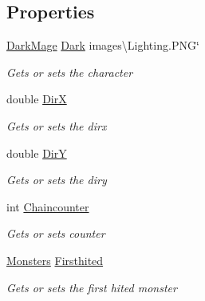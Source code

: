 \subsection*{Properties}
\begin{DoxyCompactItemize}
\item 
\hyperlink{class_lightdeath_1_1_dark_mage}{Dark\+Mage} \hyperlink{class_lightdeath_1_1_lighting_a7411b9d9c87dfdd5471312ac876105fc}{Dark} images\textbackslash{}\+Lighting.\+P\+NG\char`\"{}
\begin{DoxyCompactList}\small\item\em Gets or sets the character \end{DoxyCompactList}\item 
double \hyperlink{class_lightdeath_1_1_lighting_a22c0f43acec2e793bb2ea76a327f28d1}{DirX}
\begin{DoxyCompactList}\small\item\em Gets or sets the dirx \end{DoxyCompactList}\item 
double \hyperlink{class_lightdeath_1_1_lighting_a374459abb5204827bd07c460e9384f51}{DirY}
\begin{DoxyCompactList}\small\item\em Gets or sets the diry \end{DoxyCompactList}\item 
int \hyperlink{class_lightdeath_1_1_lighting_ab835e20ae287e354d7e2a2185a75a8c2}{Chaincounter}
\begin{DoxyCompactList}\small\item\em Gets or sets counter \end{DoxyCompactList}\item 
\hyperlink{class_lightdeath_1_1_monsters}{Monsters} \hyperlink{class_lightdeath_1_1_lighting_aa5220bba3f66dde396c673ab0871e552}{Firsthited}
\begin{DoxyCompactList}\small\item\em Gets or sets the first hited monster \end{DoxyCompactList}\item 

\end{DoxyCompactItemize}
